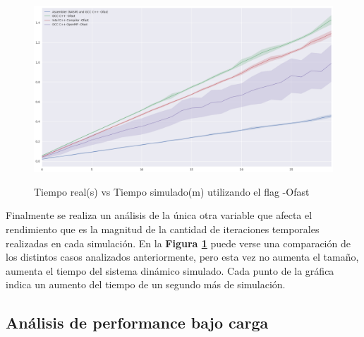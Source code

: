 \begin{figure}[!htbp]
\caption{Tiempo real(s) vs Tiempo simulado(m) utilizando el flag -Ofast}
\includegraphics[width=\textwidth]{imagenes/plot_time_omp_unused.png}
\label{fig:plot_time_omp_unused}
\end{figure}

Finalmente se realiza un análisis de la única otra variable que afecta el rendimiento que es la magnitud de la cantidad de iteraciones temporales realizadas en cada simulación. En la \textbf{Figura \ref{fig:plot_time_omp_unused}} puede verse una comparación de los distintos casos analizados anteriormente, pero esta vez no aumenta el tamaño, aumenta el tiempo del sistema dinámico simulado. Cada punto de la gráfica indica un aumento del tiempo de un segundo más de simulación. 


\subsection{Análisis de performance bajo carga}


